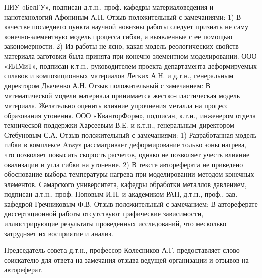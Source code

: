 НИУ «БелГУ», подписан д.т.н., проф. кафедры материаловедения и нанотехнологий Афониным А.Н. Отзыв положительный с замечаниями:
1) В качестве последнего пункта научной новизны работы следует признать не саму конечно-элементную модель процесса гибки, а выявленные с ее помощью закономерности.
2) Из работы не ясно, какая модель реологических свойств материала заготовки была принята при конечно-элементном моделировании.
ООО «ИЛМиТ», подписан к.т.н., руководителем проекта департамента деформируемых сплавов и композиционных материалов Легких А.Н. и д.т.н., генеральным директором Дьяченко А.Н. Отзыв положительный с замечанием:
В математической модели материала принимается жестко-пластическая модель материала. Желательно оценить влияние упрочнения металла на процесс образования утонения.
ООО «КванторФорм», подписан, к.т.н., инженером отдела технической поддержки Харсеевым В.Е. и к.т.н., генеральным директором Стебуновым С.А. Отзыв положительный с замечаниями:
1) Разработанная модель гибки в комплексе Ansys рассматривает деформирование только зоны нагрева, что позволяет повысить скорость расчетов, однако не позволяет учесть влияние овализации и угла гибки на утонение.
2) В тексте автореферата не приведено обоснование выбора температуры нагрева при моделировании методом конечных элементов.
Самарского университета, кафедры обработки металлов давлением, подписан д.т.н., проф. Поповым И.П. и академиком РАН, д.т.н., проф., зав. кафедрой 
Гречниковым Ф.В. Отзыв положительный с замечанием:
В автореферате диссертационной работы отсутствуют графические зависимости, иллюстрирующие результаты проведенных исследований, что несколько затрудняет их восприятие и анализ.

Председатель совета д.т.н., профессор Колесников А.Г. предоставляет слово соискателю для ответа на замечания отзыва ведущей организации и отзывов на автореферат.

